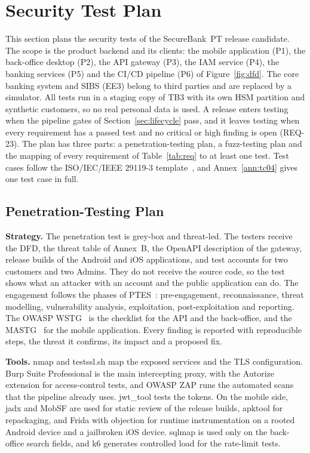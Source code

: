 \section{Security Test Plan}
\label{sec:testplan}

This section plans the security tests of the SecureBank~PT release
candidate. The scope is the product backend and its clients: the mobile
application (P1), the back-office desktop (P2), the \ac{API} gateway (P3),
the \ac{IAM} service (P4), the banking services (P5) and the \ac{CI/CD}
pipeline (P6) of Figure~\ref{fig:dfd}. The core banking system and SIBS
(EE3) belong to third parties and are replaced by a simulator. All tests
run in a staging copy of TB3 with its own \ac{HSM} partition and
synthetic customers, so no real personal data is used. A release enters
testing when the pipeline gates of Section~\ref{sec:lifecycle} pass, and
it leaves testing when every requirement has a passed test and no
critical or high finding is open (\mbox{REQ-23}). The plan has three
parts: a penetration-testing plan, a fuzz-testing plan and the mapping of
every requirement of Table~\ref{tab:req} to at least one test. Test cases
follow the ISO/IEC/IEEE 29119-3 template~\cite{iso29119}, and
Annex~\ref{ann:tc04} gives one test case in full.

\subsection{Penetration-Testing Plan}

\textbf{Strategy.} The penetration test is grey-box and threat-led. The
testers receive the \ac{DFD}, the threat table of Annex~B, the OpenAPI
description of the gateway, release builds of the Android and iOS
applications, and test accounts for two customers and two Admins. They do
not receive the source code, so the test shows what an attacker with an
account and the public application can do. The engagement follows the
phases of \ac{PTES}~\cite{ptes}: pre-engagement, reconnaissance, threat
modelling, vulnerability analysis, exploitation, post-exploitation and
reporting. The OWASP \ac{WSTG}~\cite{wstg} is the checklist for the
\ac{API} and the back-office, and the \ac{MASTG}~\cite{mastg} for the
mobile application. Every finding is reported with reproducible steps,
the threat it confirms, its impact and a proposed fix.

\textbf{Tools.} nmap and testssl.sh map the exposed services and the TLS
configuration. Burp Suite Professional is the main intercepting proxy,
with the Autorize extension for access-control tests, and OWASP ZAP runs
the automated scans that the pipeline already uses. jwt\_tool tests the
tokens. On the mobile side, jadx and MobSF are used for static review of
the release builds, apktool for repackaging, and Frida with objection for
runtime instrumentation on a rooted Android device and a jailbroken iOS
device. sqlmap is used only on the back-office search fields, and k6
generates controlled load for the rate-limit tests.

